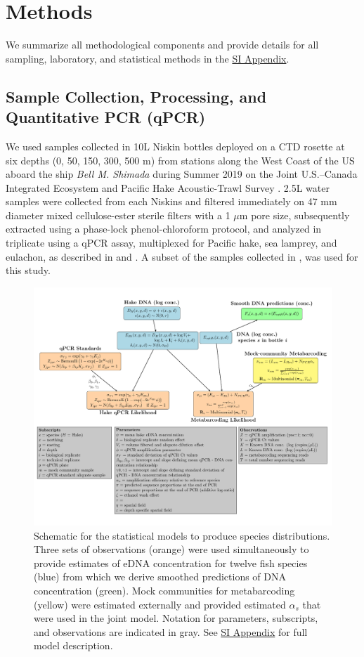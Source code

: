 \documentclass{article}
\begin{document}
\section*{Methods}
We summarize all methodological components and provide details for all sampling, laboratory, and statistical methods in the \href{SI_Appendix.pdf}{SI Appendix}.

\subsection*{Sample Collection, Processing, and Quantitative PCR (qPCR)}
We used samples collected in 10L Niskin bottles deployed on a CTD rosette at six depths (0, 50, 150, 300, 500 m) from stations along the West Coast of the US aboard the ship \textit{Bell M. Shimada} during Summer 2019 on the Joint U.S.–Canada Integrated Ecosystem and Pacific Hake Acoustic-Trawl Survey \cite{deblois2020}. 2.5L water samples were collected from each Niskins and filtered immediately on 47 mm diameter mixed cellulose-ester sterile filters with a 1 $\mu$m pore size, subsequently extracted using a phase-lock phenol-chloroform protocol, and analyzed in triplicate using a qPCR assay, multiplexed for Pacific hake, sea lamprey, and eulachon, as described in \cite{ramon-laca2021} and \cite{shelton2022}. A subset of the samples collected in \cite{shelton2022}, was used for this study. 

\begin{figure}[tbhp] 
\centering
\includegraphics[width=16cm]{plots/DAG-Ole.pdf} 
\caption{Schematic for the statistical models to produce species distributions. Three sets of observations (orange) were used simultaneously to provide estimates of eDNA concentration for  twelve fish species (blue) from which we derive smoothed predictions of DNA concentration (green). Mock communities for metabarcoding (yellow) were estimated externally and provided estimated $\alpha_s$ that were used in the joint model. Notation for parameters, subscripts, and observations are indicated in gray. See \href{SI_Appendix.pdf}{SI Appendix} for full model description.}
\label{fig:DAG2}
\end{figure}
\end{document}
